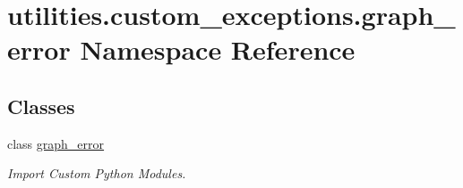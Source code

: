 \hypertarget{namespaceutilities_1_1custom__exceptions_1_1graph__error}{}\section{utilities.\+custom\+\_\+exceptions.\+graph\+\_\+error Namespace Reference}
\label{namespaceutilities_1_1custom__exceptions_1_1graph__error}
\subsection*{Classes}
\begin{DoxyCompactItemize}
\item 
class \hyperlink{classutilities_1_1custom__exceptions_1_1graph__error_1_1graph__error}{graph\+\_\+error}
\begin{DoxyCompactList}\small\item\em Import Custom Python Modules. \end{DoxyCompactList}\end{DoxyCompactItemize}
